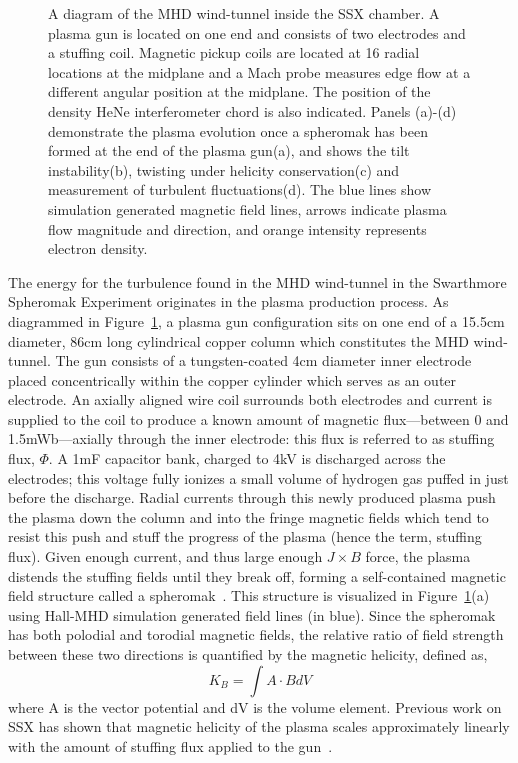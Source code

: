 \documentclass[manuscript]{aastex}
\begin{document}
\begin{figure}
\caption{\label{fig:moviestills} A diagram of the MHD wind-tunnel inside the SSX chamber. A plasma gun is located on one end and consists of two electrodes and a stuffing coil. Magnetic pickup coils are located at 16 radial locations at the midplane and a Mach probe measures edge flow at a different angular position at the midplane. The position of the density HeNe interferometer chord is also indicated. Panels (a)-(d) demonstrate the plasma evolution once a spheromak has been formed at the end of the plasma gun(a), and shows the tilt instability(b), twisting under helicity conservation(c) and measurement of turbulent fluctuations(d). The blue lines show simulation generated magnetic field lines, arrows indicate plasma flow magnitude and direction, and orange intensity represents electron density.}
\end{figure}

The energy for the turbulence found in the MHD wind-tunnel in the Swarthmore Spheromak Experiment originates in the plasma production process. As diagrammed in Figure~\ref{fig:moviestills}, a plasma gun configuration sits on one end of a 15.5cm diameter, 86cm long cylindrical copper column which constitutes the MHD wind-tunnel. The gun consists of a tungsten-coated 4cm diameter inner electrode placed concentrically within the copper cylinder which serves as an outer electrode. An axially aligned wire coil surrounds both electrodes and current is supplied to the coil to produce a known amount of magnetic flux---between 0 and 1.5mWb---axially through the inner electrode: this flux is referred to as stuffing flux, $\Phi$. A 1mF capacitor bank, charged to 4kV is discharged across the electrodes; this voltage fully ionizes a small volume of hydrogen gas puffed in just before the discharge. Radial currents through this newly produced plasma push the plasma down the column and into the fringe magnetic fields which tend to resist this push and stuff the progress of the plasma (hence the term, stuffing flux). Given enough current, and thus large enough $J\times B$ force, the plasma distends the stuffing fields until they break off, forming a self-contained magnetic field structure called a spheromak~\citep{bar86,jar94}. This structure is visualized in Figure~\ref{fig:moviestills}(a) using Hall-MHD simulation generated field lines (in blue). Since the spheromak has both polodial and torodial magnetic fields, the relative ratio of field strength between these two directions is quantified by the magnetic helicity, defined as,
\begin{equation}
K_{B} = \int A \cdot B dV
\label{eq:helicity_th}
\end{equation}
where A is the vector potential and dV is the volume element. Previous work on SSX has shown that magnetic helicity of the plasma scales approximately linearly with the amount of stuffing flux applied to the gun~\citep{sch14b}.
\end{document}
